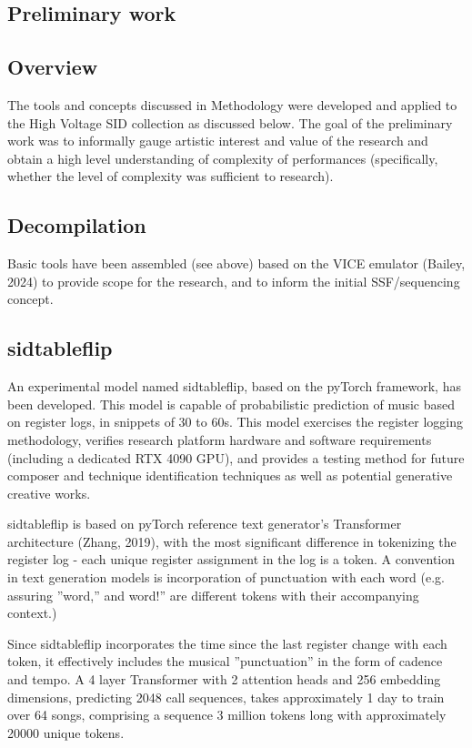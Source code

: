 \documentclass[10pt]{article}
\begin{document}
\begin{multicols*}{2}
  \section{Preliminary work}

\subsection{Overview}

The tools and concepts discussed in Methodology were developed and applied to the High Voltage SID collection as discussed below. The goal of the preliminary work was to informally gauge artistic interest and value of the research and obtain a high level understanding of complexity of performances (specifically, whether the level of complexity was sufficient to research).

\subsection{Decompilation}

Basic tools have been assembled (see above) based on the VICE emulator (Bailey, 2024) to provide scope for the research, and to inform the initial SSF/sequencing concept.

\subsection{sidtableflip}

An experimental model named sidtableflip\cite{sidtableflip}, based on the pyTorch framework, has been developed. This model is capable of probabilistic prediction of music based on register logs, in snippets of 30 to 60s. This model exercises the register logging methodology, verifies research platform hardware and software requirements (including a dedicated RTX 4090 GPU), and provides a testing method for future composer and technique identification techniques as well as potential generative creative works.

sidtableflip is based on pyTorch reference text generator’s Transformer architecture (Zhang, 2019), with the most significant difference in tokenizing the register log - each unique register assignment in the log is a token. A convention in text generation models is incorporation of punctuation with each word (e.g. assuring ”word,” and word!” are different tokens with their accompanying context.)

Since sidtableflip incorporates the time since the last register change with each token,  it effectively includes the musical ”punctuation” in the form of cadence and tempo. A 4 layer Transformer with 2 attention heads and 256 embedding dimensions, predicting 2048 call sequences, takes approximately 1 day to train over 64 songs, comprising a sequence 3 million tokens long with approximately 20000 unique tokens.


\end{multicols*}
\end{document}
